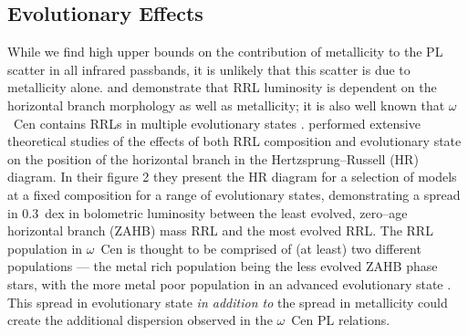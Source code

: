 \documentclass[a4paper,fleqn,usenatbib]{mnras}
\newcommand{\ocen}{$\omega$~Cen\xspace}
\begin{document}


\subsection{Evolutionary Effects}
\label{sec:evolution}
While we find high upper bounds on the contribution of metallicity to the PL scatter in all infrared passbands, it is unlikely that this scatter is due to metallicity alone. \citet{1986A&A...169..111G} and \citet{1991ApJ...373L..43L}  demonstrate that RRL luminosity is dependent on the horizontal branch morphology as well as metallicity; it is also well known that \ocen contains RRLs in multiple evolutionary states \citep{2008MmSAI..79..342S, 2015A&A...577A..99N}. \citet{2015ApJ...808...50M} performed extensive theoretical studies of the effects of both RRL composition and evolutionary state on the position of the horizontal branch in the Hertzsprung--Russell (HR) diagram. In their figure 2 they present the HR diagram for a selection of models at a fixed composition for a range of evolutionary states, demonstrating a spread in 0.3~dex in bolometric luminosity between the least evolved, zero--age horizontal branch (ZAHB) mass RRL and the most evolved RRL. The RRL population in \ocen is thought to be comprised of (at least) two different populations --- the metal rich population being the less evolved ZAHB phase stars, with the more metal poor population in an advanced evolutionary state \citep{2016MNRAS.457.4525T}. This spread in evolutionary state \textit{in addition to} the spread in metallicity could create the additional dispersion observed in the \ocen PL relations. 

\end{document}

